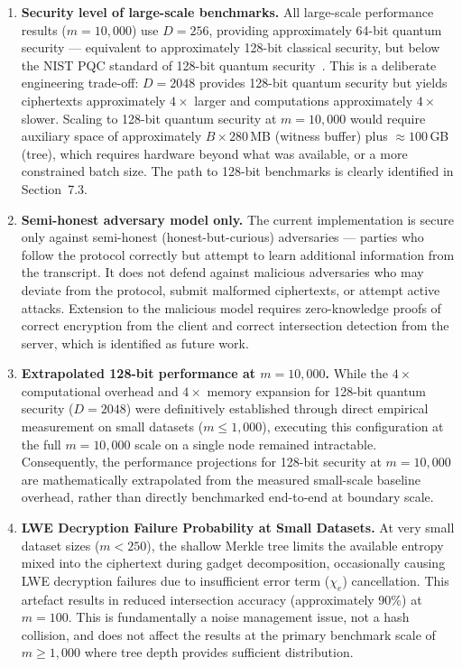 \begin{enumerate}
    \item \textbf{Security level of large-scale benchmarks.} All large-scale
          performance results ($m = 10{,}000$) use $D = 256$, providing approximately
          64-bit quantum security --- equivalent to approximately 128-bit classical
          security, but below the NIST PQC standard of 128-bit quantum security~\cite{albrecht2015hardness}.
          This is a deliberate engineering trade-off: $D = 2048$ provides 128-bit quantum
          security but yields ciphertexts approximately $4\times$ larger and computations
          approximately $4\times$ slower. Scaling to 128-bit quantum security at
          $m = 10{,}000$ would require auxiliary space of approximately
          $B \times 280$\,MB (witness buffer) plus $\approx 100$\,GB (tree), which
          requires hardware beyond what was available, or a more constrained batch
          size. The path to 128-bit benchmarks is clearly identified in Section~7.3.

    \item \textbf{Semi-honest adversary model only.} The current implementation is
          secure only against semi-honest (honest-but-curious) adversaries --- parties
          who follow the protocol correctly but attempt to learn additional information
          from the transcript. It does not defend against malicious adversaries who
          may deviate from the protocol, submit malformed ciphertexts, or attempt
          active attacks. Extension to the malicious model requires zero-knowledge
          proofs of correct encryption from the client and correct intersection
          detection from the server, which is identified as future work.

    \item \textbf{Extrapolated 128-bit performance at $m = 10{,}000$.} While the $4\times$ computational overhead and $4\times$ memory expansion for 128-bit quantum security ($D = 2048$) were definitively established through direct empirical measurement on small datasets ($m \le 1{,}000$), executing this configuration at the full $m = 10{,}000$ scale on a single node remained intractable. Consequently, the performance projections for 128-bit security at $m = 10{,}000$ are mathematically extrapolated from the measured small-scale baseline overhead, rather than directly benchmarked end-to-end at boundary scale.

    \item \textbf{LWE Decryption Failure Probability at Small Datasets.} At very
          small dataset sizes ($m < 250$), the shallow Merkle tree limits the
          available entropy mixed into the ciphertext during gadget decomposition,
          occasionally causing LWE decryption failures due to insufficient error
          term ($\chi_e$) cancellation. This artefact results in reduced intersection
          accuracy (approximately 90\%) at $m = 100$. This is fundamentally a noise
          management issue, not a hash collision, and does not affect the
          results at the primary benchmark scale of $m \ge 1{,}000$ where tree depth
          provides sufficient distribution.


\end{enumerate}
